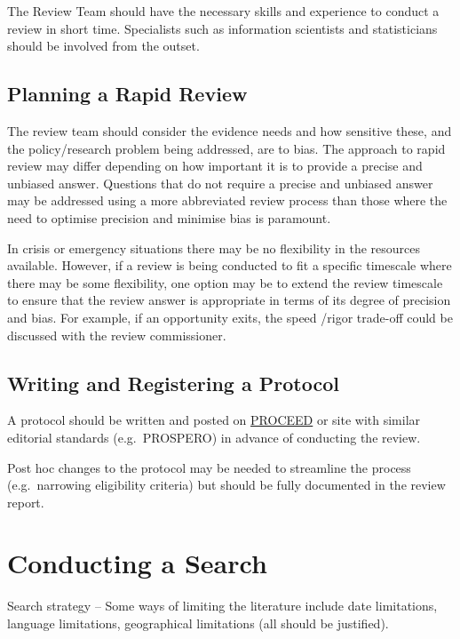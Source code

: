 \documentclass[
  letterpaper,
  DIV=11,
  numbers=noendperiod]{scrreprt}
\begin{document}
The Review Team should have the necessary skills and experience to
conduct a review in short time. Specialists such as information
scientists and statisticians should be involved from the outset.

\subsection{Planning a Rapid Review}\label{planning-a-rapid-review}

The review team should consider the evidence needs and how sensitive
these, and the policy/research problem being addressed, are to bias. The
approach to rapid review may differ depending on how important it is to
provide a precise and unbiased answer. Questions that do not require a
precise and unbiased answer may be addressed using a more abbreviated
review process than those where the need to optimise precision and
minimise bias is paramount.

In crisis or emergency situations there may be no flexibility in the
resources available. However, if a review is being conducted to fit a
specific timescale where there may be some flexibility, one option may
be to extend the review timescale to ensure that the review answer is
appropriate in terms of its degree of precision and bias. For example,
if an opportunity exits, the speed /rigor trade-off could be discussed
with the review commissioner.

\subsection{Writing and Registering a
Protocol}\label{writing-and-registering-a-protocol}

A protocol should be written and posted on
\href{https://www.proceedevidence.info/}{PROCEED} or site with similar
editorial standards (e.g.~PROSPERO) in advance of conducting the review.

Post hoc changes to the protocol may be needed to streamline the process
(e.g.~narrowing eligibility criteria) but should be fully documented in
the review report.

\section{Conducting a Search}\label{conducting-a-search}

Search strategy -- Some ways of limiting the literature include date
limitations, language limitations, geographical limitations (all should
be justified).
\end{document}
